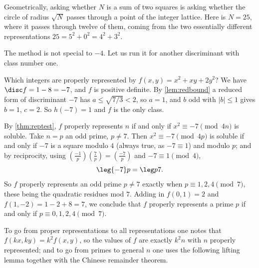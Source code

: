 Geometrically, asking whether $N$ is a sum of two squares is asking whether the circle of radius $\sqrt N$ passes through a point of the integer lattice. Here is $N = 25$, where it passes through twelve of them, coming from the two essentially different representations $25 = 5^2 + 0^2 = 4^2 + 3^2$.

\begin{center}
\end{center}

The method is not special to $-4$. Let us run it for another discriminant with class number one.

\begin{example}
	Which integers are properly represented by $f(x,y) = x^2 + xy + 2y^2$? We have $\disc f = 1 - 8 = -7$, and $f$ is positive definite. By \autoref{lem:redbound} a reduced form of discriminant $-7$ has $a \leq \sqrt{7/3} < 2$, so $a = 1$, and $b$ odd with $|b| \leq 1$ gives $b = 1$, $c = 2$. So $h(-7) = 1$ and $f$ is the only class.

	By \autoref{thm:reptest}, $f$ properly represents $n$ if and only if $x^2 \equiv -7 \pmod{4n}$ is soluble. Take $n = p$ an odd prime, $p \neq 7$. Then $x^2 \equiv -7 \pmod{4p}$ is soluble if and only if $-7$ is a square modulo $4$ (always true, as $-7 \equiv 1$) and modulo $p$; and by reciprocity, using $\left( \frac{-1}p \right)\left( \frac 7p \right) = \left( \frac{-7}p \right)$ and $-7 \equiv 1 \pmod 4$,
	$$
	\leg{-7}p = \leg p7.
	$$
	So $f$ properly represents an odd prime $p \neq 7$ exactly when $p \equiv 1, 2, 4 \pmod 7$, these being the quadratic residues mod $7$. Adding in $f(0,1) = 2$ and $f(1,-2) = 1 - 2 + 8 = 7$, we conclude that $f$ properly represents a prime $p$ if and only if $p \equiv 0, 1, 2, 4 \pmod 7$.
\end{example}

To go from proper representations to all representations one notes that $f(kx, ky) = k^2f(x,y)$, so the values of $f$ are exactly $k^2 n$ with $n$ properly represented; and to go from primes to general $n$ one uses the following lifting lemma together with the Chinese remainder theorem.

